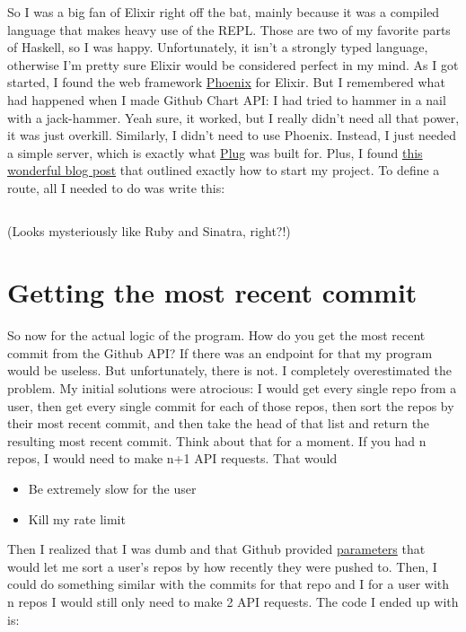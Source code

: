\documentclass[12pt]{article}
\begin{document}
  So I was a big fan of Elixir right off the bat, mainly because it was a compiled language that makes heavy use of the REPL. Those are two of my favorite parts of Haskell, so I was happy. Unfortunately, it isn't a strongly typed language, otherwise I'm pretty sure Elixir would be considered perfect in my mind. As I got started, I found the web framework \href{http://www.phoenixframework.org/}{Phoenix} for Elixir. But I remembered what had happened when I made Github Chart API: I had tried to hammer in a nail with a jack-hammer. Yeah sure, it worked, but I really didn't need all that power, it was just overkill. Similarly, I didn't need to use Phoenix. Instead, I just needed a simple server, which is exactly what \href{https://github.com/elixir-lang/plug#the-plug-router}{Plug} was built for. Plus, I found \href{http://blog.simonstrom.xyz/elixir-a-simple-server-with-plug/}{this wonderful blog post} that outlined exactly how to start my project. To define a route, all I needed to do was write this:

  \inputminted[firstline=0, lastline=3]{elixir}{../resources/elixir-of-life/script.ex}

  (Looks mysteriously like Ruby and Sinatra, right?!)

  \section{Getting the most recent commit}

  So now for the actual logic of the program. How do you get the most recent commit from the Github API? If there was an endpoint for that my program would be useless. But unfortunately, there is not. I completely overestimated the problem. My initial solutions were atrocious: I would get every single repo from a user, then get every single commit for each of those repos, then sort the repos by their most recent commit, and then take the head of that list and return the resulting most recent commit. Think about that for a moment. If you had n repos, I would need to make n+1 API requests. That would 

  \begin{itemize}
    \item Be extremely slow for the user
    \item Kill my rate limit
  \end{itemize}

  Then I realized that I was dumb and that Github provided \href{https://developer.github.com/v3/repos/#list-user-repositories}{parameters} that would let me sort a user's repos by how recently they were pushed to. Then, I could do something similar with the commits for that repo and I for a user with n repos I would still only need to make 2 API requests. The code I ended up with is:
\end{document}
